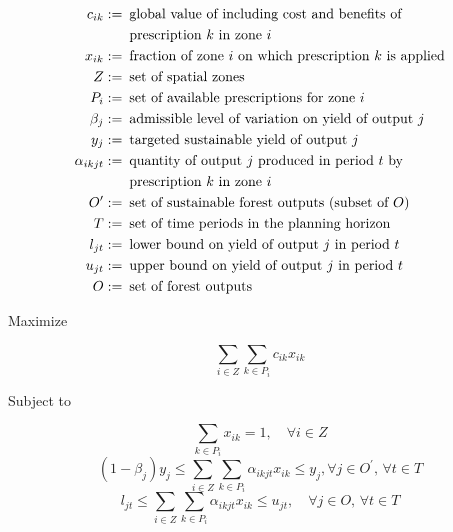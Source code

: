 \medskip
\noindent
\begin{displaymath}
\begin{alignedat}{1}
  c_{ik}:=\, & \text{ global value of including cost and benefits of}\\
                & \text{ prescription \ensuremath{k} in zone \ensuremath{i}}\\
  x_{ik}:=\, & \text{ fraction of zone \ensuremath{i} on which prescription \ensuremath{k} is applied}\\
  Z:=\, & \text{ set of spatial zones}\\
  P_{i}:=\, & \text{ set of available prescriptions for zone \ensuremath{i}}\\
  \beta_{j}:=\, & \text{ admissible level of variation on yield of output \ensuremath{j}}\\
  y_{j}:=\, & \text{ targeted sustainable yield of output \ensuremath{j}}\\
  \alpha_{ikjt}:=\, & \text{ quantity of output \ensuremath{j} produced in period \ensuremath{t} by}\\
                           & \text{ prescription \ensuremath{k} in zone \ensuremath{i}}\\
  O^{\prime}:=\, & \text{ set of sustainable forest outputs (subset of \ensuremath{O})}\\
  T:=\, & \text{ set of time periods in the planning horizon}\\
  l_{jt}:=\, & \text{ lower bound on yield of output \ensuremath{j} in period \ensuremath{t}}\\
  u_{jt}:=\, & \text{ upper bound on yield of output \ensuremath{j} in period \ensuremath{t}}\\
  O:=\, & \text{ set of forest outputs}
\end{alignedat}
\end{displaymath}

\medskip
\noindent
Maximize

\begin{equation}
\label{eq:ltz}
\sum_{i\in Z}\sum_{k\in P_{i}}c_{ik}x_{ik}
\end{equation}

\noindent
Subject to

\begin{equation}
\label{eq:ltc1}
\sum_{k\in P_{i}}x_{ik}=1,\quad \forall i\in Z
\end{equation}
\begin{equation}
\label{eq:ltc2}
 (1-\beta_{j})y_{j} \leq \sum_{i\in Z}\sum_{k\in P_{i}}\alpha_{ikjt}x_{ik}\leq y_{j},\forall j\in O^{\prime},\,\forall t\in T
\end{equation}
\begin{equation}
\label{eq:ltc3}
l_{jt}\leq\sum_{i\in Z}\sum_{k\in P_{i}}\alpha_{ikjt}x_{ik}\leq u_{jt},\quad \forall j\in O,\,\forall t\in T
\end{equation}



